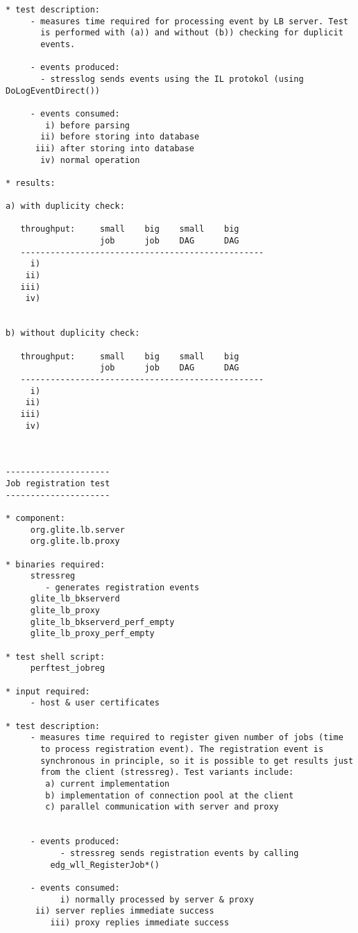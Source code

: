 \documentclass{egee}
\begin{document}
\begin{verbatim}
* test description:
     - measures time required for processing event by LB server. Test
       is performed with (a)) and without (b)) checking for duplicit
       events. 

     - events produced:
	   - stresslog sends events using the IL protokol (using DoLogEventDirect())

     - events consumed:
	    i) before parsing
	   ii) before storing into database
	  iii) after storing into database
	   iv) normal operation

* results:

a) with duplicity check:

   throughput:     small    big    small    big 
                   job      job    DAG      DAG 
   -------------------------------------------------
     i)
    ii)
   iii)
    iv)


b) without duplicity check:

   throughput:     small    big    small    big 
                   job      job    DAG      DAG 
   -------------------------------------------------
     i)
    ii)
   iii)
    iv)



---------------------
Job registration test
---------------------

* component:
     org.glite.lb.server
     org.glite.lb.proxy

* binaries required:
     stressreg
        - generates registration events
     glite_lb_bkserverd
     glite_lb_proxy
     glite_lb_bkserverd_perf_empty
     glite_lb_proxy_perf_empty
     
* test shell script:
     perftest_jobreg

* input required:
     - host & user certificates

* test description:
     - measures time required to register given number of jobs (time
       to process registration event). The registration event is
       synchronous in principle, so it is possible to get results just
       from the client (stressreg). Test variants include:
	    a) current implementation
	    b) implementation of connection pool at the client
	    c) parallel communication with server and proxy
       
       
     - events produced:
           - stressreg sends registration events by calling
	     edg_wll_RegisterJob*()

     - events consumed:
           i) normally processed by server & proxy
	  ii) server replies immediate success
         iii) proxy replies immediate success


\end{verbatim}
\end{document}
